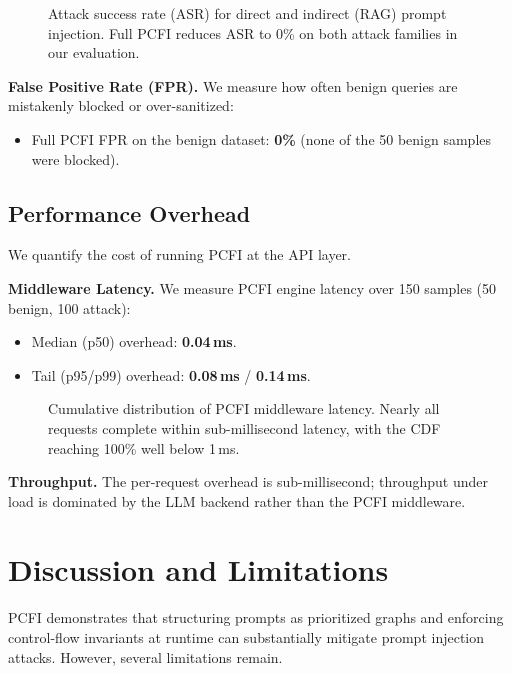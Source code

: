 \documentclass[conference]{IEEEtran}
\begin{document}
\begin{figure}[t]
\centering
\resizebox{\linewidth}{!}{}
\caption{Attack success rate (ASR) for direct and indirect (RAG) prompt injection. Full PCFI reduces ASR to 0\% on both attack families in our evaluation.}
\label{fig:asr_comparison}
\end{figure}

\textbf{False Positive Rate (FPR).} We measure how often benign queries are mistakenly blocked or over-sanitized:

\begin{itemize}
  \item Full PCFI FPR on the benign dataset: \textbf{0\%} (none of the 50 benign samples were blocked).
\end{itemize}

\subsection{Performance Overhead}

We quantify the cost of running PCFI at the API layer.

\textbf{Middleware Latency.} We measure PCFI engine latency over 150 samples (50 benign, 100 attack):

\begin{itemize}
  \item Median (p50) overhead: \textbf{0.04\,ms}.
  \item Tail (p95/p99) overhead: \textbf{0.08\,ms} / \textbf{0.14\,ms}.
\end{itemize}

\begin{figure}[t]
\centering
\resizebox{\linewidth}{!}{}
\caption{Cumulative distribution of PCFI middleware latency. Nearly all requests complete within sub-millisecond latency, with the CDF reaching 100\% well below 1\,ms.}
\label{fig:latency_cdf}
\end{figure}

\textbf{Throughput.} The per-request overhead is sub-millisecond; throughput under load is dominated by the LLM backend rather than the PCFI middleware.

\section{Discussion and Limitations}

PCFI demonstrates that structuring prompts as prioritized graphs and enforcing control-flow invariants at runtime can substantially mitigate prompt injection attacks. However, several limitations remain.
\end{document}
